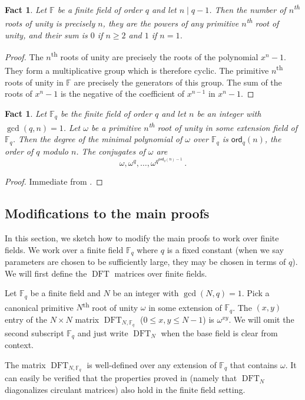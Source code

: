 \documentclass{toc}
\newtheorem{fact.}[theorem]{Fact}
\newcommand\F{{\mathbb{F}}}
\newcommand\ord{\textsf{ord}}
\newcommand{\ts}{\textsuperscript}
\DeclareMathOperator{\DFT}{DFT}
\begin{document}
\begin{fact.}   \label{sumofroots}
Let $\F$ be a finite field of order $q$ and let $n\mid q-1$.
Then the number of $n$\ts{th} roots of unity is precisely $n$,
they are the powers of any primitive $n$\ts{th} root of unity,
and their sum is $0$ if $n\ge 2$ and $1$ if $n=1$.
\end{fact.}
\begin{proof}
The $n$\ts{th} roots of unity are precisely the roots of
the polynomial $x^n-1$.  They form a multiplicative group
which is therefore cyclic.  The primitive $n$\ts{th} roots
of unity in $\F$ are precisely the generators of this group.
The sum of the roots of $x^n-1$ is the negative of the
coefficient of $x^{n-1}$ in $x^n-1$.
\end{proof}
 
\begin{fact.}\label{order}
Let $\F_q$ be the finite field of order $q$ 
and let $n$ be an integer with $\gcd(q,n) = 1$.  
Let $\omega$ be a primitive $n$\ts{th} root of unity
in some extension field of $\F_q$.
Then the degree of the minimal polynomial of $\omega$ over
$\F_q$ is $\ord_q(n)$, the order of $q$ modulo $n$.
The conjugates of $\omega$ are
\[
\omega, \omega^q, \dots , \omega^{q^{\ord_q(n)-1}} \,.
\]
\end{fact.}
\begin{proof}
Immediate from .
\end{proof}

\subsection{Modifications to the main proofs}
In this section, we sketch how to modify the main proofs to work over finite fields.  We work over a finite field $\F_q$ where $q$ is a fixed constant (when we say parameters are chosen to be sufficiently large, they may be chosen in terms of $q$).  We will first define the $\DFT$ matrices over finite fields.
\begin{definition}
Let $\F_q$ be a finite field and $N$ be an integer with $\gcd(N,q) = 1$.  Pick a canonical primitive $N$\ts{th} root of unity $\omega$ in some extension of $\F_q$.  The $(x,y)$ entry of the $N \times N$ matrix $\DFT_{N,\F_q}$ ($0 \leq x,y \leq N - 1$) is $\omega^{xy}$.  We will omit the second subscript $\F_q$ and just write $\DFT_N$ when the base field is clear from context.
\end{definition}
\begin{remark}\label{finitefield_basicprops}
The matrix $\DFT_{N, \F_q}$ is well-defined over any extension of $\F_q$ that contains $\omega$.  It can easily be verified that the properties proved in  (namely that $\DFT_N$ diagonalizes circulant matrices) also hold in the finite field setting.
\end{remark}
\end{document}
